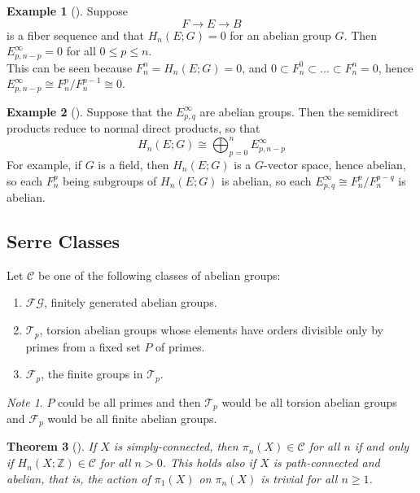 \documentclass[reqno]{amsart}
\newtheorem{theorem}{Theorem}[section]
\theoremstyle{definition}
\newtheorem{example}[theorem]{Example}
\theoremstyle{remark}
\newtheorem*{note}{Note}
\begin{document}
\begin{example}[]
    Suppose
    \[
    F \to E \to B
    \] 
    is a fiber sequence and that
    $H_n(E;G) = 0$ for an abelian group $G$.
    Then $E_{p, n -p}^{\infty} = 0$ for all
    $0 \le p \le n$.\\
    This can be seen because
    $F_{n}^{n} = H_n(E;G) = 0$, and
    $0 \subset F_n^{0} \subset \ldots \subset 
    F_n^{n} = 0$, hence
    $E_{p, n-p}^{\infty} \cong
    F_n^{p} / F_n^{p-1} \cong 0$.
\end{example}
    

\begin{example}[]
    Suppose that the $E_{p,q}^{\infty}$ are abelian groups.
    Then the semidirect products reduce to normal direct
    products, so that
    \[
    H_n(E;G) \cong
    \bigoplus_{p=0}^{n} E_{p,n-p}^{\infty}
    \] 
    For example, if $G$ is a field, then 
    $H_n(E;G)$ is a $G$-vector space, hence abelian, so
    each $F_n^{p}$ being subgroups of $H_n(E;G)$ is abelian,
    so each $E_{p,q}^{\infty} \cong
    F_{n}^{p} / F_{n}^{p-q}$ is abelian.
\end{example}


\subsection{Serre Classes}

Let
$\mathcal{C}$ be one of the following classes of abelian groups:
\begin{enumerate}
    \item $\mathcal{F} \mathcal{G}$, finitely generated
        abelian groups.
    \item $\mathcal{T}_p$, torsion abelian groups whose
        elements have orders divisible only by
        primes from a fixed set $P$ of primes.
    \item $\mathcal{F}_p$, the finite groups
        in $\mathcal{T}_p$.
\end{enumerate}


\begin{note}
    $P$ could be all primes and then $\mathcal{T}_p$ would
    be all torsion abelian groups and
    $\mathcal{F}_p$ would be all finite abelian groups.
\end{note}

\begin{theorem}[]
    If $X$ is simply-connected, then $\pi_n (X) \in 
    \mathcal{C}$ for all $n$ if and only if
    $H_n(X;\mathbb{Z}) \in \mathcal{C}$ for all
    $n > 0$. This holds also if
    $X$ is path-connected and abelian, that is, the
    action of $\pi_1 (X)$ on $\pi_n(X)$ is trivial
    for all $n\ge 1$.
\end{theorem}
\end{document}
